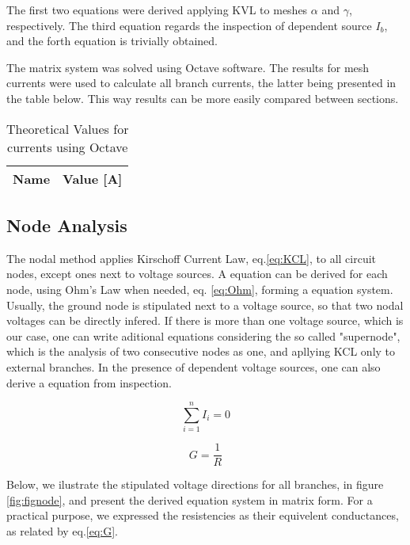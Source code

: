 \par The first two equations were derived applying KVL to meshes $\alpha$ and $\gamma$, respectively. The third equation regards the inspection of dependent source $I_b$, and the forth equation is trivially obtained.

\par The matrix system was solved using Octave software. The results for mesh currents were used to calculate all branch currents, the latter being presented in the table below. This way results can be more easily compared between sections.



\begin{table}[H]
  \centering
  \begin{tabular}{|l|r|}
    \hline
    {\bf Name} & {\bf Value [A]} \\ \hline
    
  \end{tabular}
  \caption{Theoretical Values for currents using Octave}
  \label{tab:TCurrents}
\end{table}

\subsection{Node Analysis}
\par The nodal method applies Kirschoff Current Law, eq.\ref{eq:KCL}, to all circuit nodes, except ones next to voltage sources. A equation can be derived for each node, using Ohm's Law when needed, eq. \ref{eq:Ohm}, forming a equation system. Usually, the ground node is stipulated next to a voltage source, so that two nodal voltages can be directly infered. If there is more than one voltage source, which is our case, one can write aditional equations considering the so called "supernode", which is the analysis of two consecutive nodes as one, and apllying KCL only to external branches. In the presence of dependent voltage sources, one can also derive a equation from inspection. 
\begin{multicols}{2}
\begin{equation}
    \sum_{i=1}^{n} I_i = 0
    \label{eq:KCL}
\end{equation}

\begin{equation}
    G = \frac{1}{R}
    \label{eq:G}
\end{equation}
\end{multicols}

Below, we ilustrate the stipulated voltage directions for all branches, in figure \ref{fig:fignode}, and present the derived equation system in matrix form. For a practical purpose, we expressed the resistencies as their equivelent conductances, as related by eq.\ref{eq:G}.


